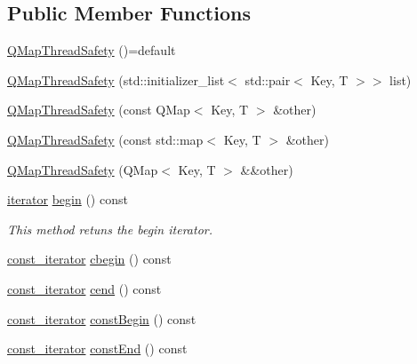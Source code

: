 \subsection*{Public Member Functions}
\begin{DoxyCompactItemize}
\item 
\hyperlink{class_c_w_f_1_1_q_map_thread_safety_aa28e819ea29dda98fd7c59b065fffb5b}{Q\+Map\+Thread\+Safety} ()=default
\item 
\hyperlink{class_c_w_f_1_1_q_map_thread_safety_ab9689787571fcba2c0b01ffadeaeaf53}{Q\+Map\+Thread\+Safety} (std\+::initializer\+\_\+list$<$ std\+::pair$<$ Key, T $>$$>$ list)
\item 
\hyperlink{class_c_w_f_1_1_q_map_thread_safety_a8548badbf58d475d80975c93fc691402}{Q\+Map\+Thread\+Safety} (const Q\+Map$<$ Key, T $>$ \&other)
\item 
\hyperlink{class_c_w_f_1_1_q_map_thread_safety_af6419868bb72e73f260158d8b8fa33f0}{Q\+Map\+Thread\+Safety} (const std\+::map$<$ Key, T $>$ \&other)
\item 
\hyperlink{class_c_w_f_1_1_q_map_thread_safety_a3ea02eba2e70b15a41ebea53409b2504}{Q\+Map\+Thread\+Safety} (Q\+Map$<$ Key, T $>$ \&\&other)
\item 
\hyperlink{class_c_w_f_1_1_q_map_thread_safety_a3c4ab1dfd3da9557e0f2ea9e480466f9}{iterator} \hyperlink{class_c_w_f_1_1_q_map_thread_safety_a7a80b8b9a85b42ad2e359729f15688b0}{begin} () const 
\begin{DoxyCompactList}\small\item\em This method retuns the begin iterator. \end{DoxyCompactList}\item 
\hyperlink{class_c_w_f_1_1_q_map_thread_safety_ae9f60ca27b6f4af8753cf15211fe5c70}{const\+\_\+iterator} \hyperlink{class_c_w_f_1_1_q_map_thread_safety_ad8db13f1eb2fe504be93c63b9f90f252}{cbegin} () const 
\item 
\hyperlink{class_c_w_f_1_1_q_map_thread_safety_ae9f60ca27b6f4af8753cf15211fe5c70}{const\+\_\+iterator} \hyperlink{class_c_w_f_1_1_q_map_thread_safety_a1b9cc99456829c373da1c5e9aa296861}{cend} () const 
\item 
\hyperlink{class_c_w_f_1_1_q_map_thread_safety_ae9f60ca27b6f4af8753cf15211fe5c70}{const\+\_\+iterator} \hyperlink{class_c_w_f_1_1_q_map_thread_safety_acff8188cd77234c5a4cda7eb1150f59a}{const\+Begin} () const 
\item 
\hyperlink{class_c_w_f_1_1_q_map_thread_safety_ae9f60ca27b6f4af8753cf15211fe5c70}{const\+\_\+iterator} \hyperlink{class_c_w_f_1_1_q_map_thread_safety_adab0331184dab2b2fcb8e0bf3673a517}{const\+End} () const 
$$
\end{DoxyCompactItemize}
